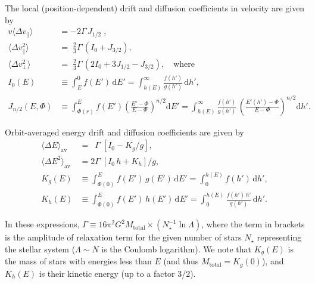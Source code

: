 \documentclass[12pt]{article}
\renewcommand{\d}{\mathrm{d}}
\newcommand{\dvpar}{\langle \Delta v_\| \rangle}
\newcommand{\dvsqpar}{\langle \Delta v^2_\| \rangle}
\newcommand{\dvsqper}{\langle \Delta v^2_\bot \rangle}
\begin{document}
The local (position-dependent) drift and diffusion coefficients in velocity are given by
\begin{subequations}
\begin{align}
v\dvpar &= \textstyle -2\Gamma\, J_{1/2} \;,\\
\dvsqpar&= \textstyle \;\frac{2}{3}\Gamma\, \left(I_0 + J_{3/2}\right) , \\
\dvsqper&= \textstyle \;\frac{2}{3}\Gamma\, \left(2 I_0 + 3 J_{1/2} - J_{3/2}\right) , \quad\mbox{where} \\
I_0(E)     &\equiv \int_E^0 f(E')\, \d E' = \int_{h(E)}^\infty \frac{f(h')}{g(h')}\, \d h', \\
J_{n/2}(E,\Phi) &\equiv \int_{\Phi(r)}^E f(E') \left(\frac{E'-\Phi}{E-\Phi}\right)^{n/2} \d E' = 
 \int_{h(E)}^\infty \frac{f(h')}{g(h')}\, \left(\frac{E'(h')-\Phi}{E-\Phi}\right)^{n/2} \d h'.
\end{align}
\end{subequations}

Orbit-averaged energy drift and diffusion coefficients are given by
\begin{subequations}  \label{eq:DriftDiffusionE}
\begin{align}
\langle \Delta E   \rangle_\mathrm{av} &= \phantom{2} \Gamma\; \left[I_0 - K_g/g \right], \\
\langle \Delta E^2 \rangle_\mathrm{av} &= 2\Gamma\; \left[I_0\,h + K_h\right]/g, \\
K_g(E) &\equiv \int_{\Phi(0)}^E f(E')\,g(E')\,\d E' = \int_0^{h(E)} f(h')\,\d h', \\
K_h(E) &\equiv \int_{\Phi(0)}^E f(E')\,h(E')\,\d E' = \int_0^{h(E)} \frac{f(h')\,h'}{g(h')}\,\d h'.
\end{align}
\end{subequations}

In these expressions, $\Gamma  \equiv 16\pi^2 G^2 M_\mathrm{total} \times (N_\star^{-1}\ln\Lambda)$, where the term in brackets is the amplitude of relaxation term for the given number of stars $N_\star$ representing the stellar system ($\Lambda \sim N$ is the Coulomb logarithm). We note that $K_g(E)$ is the mass of stars with energies less than $E$ (and thus $M_\mathrm{total} = K_g(0)$), and $K_h(E)$ is their kinetic energy (up to a factor 3/2).
\end{document}
